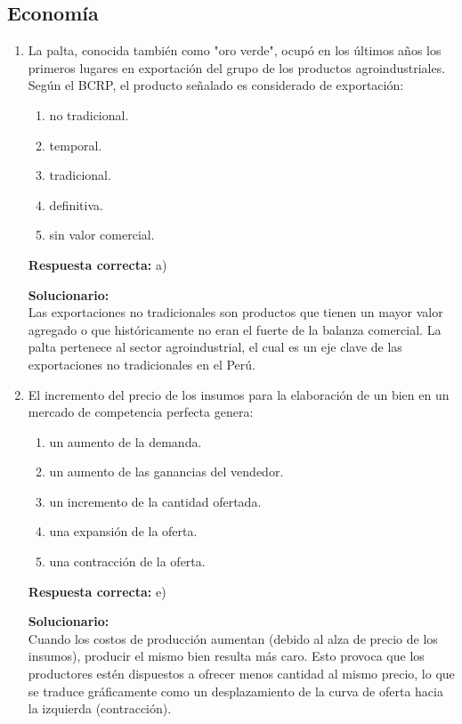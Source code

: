 \subsection*{Economía}

\begin{enumerate}
	
	\item La palta, conocida también como "oro verde", ocupó en los últimos años los primeros lugares en exportación del grupo de los productos agroindustriales. Según el BCRP, el producto señalado es considerado de exportación:
	\begin{enumerate}[label=\alph*)]
		\item no tradicional.
		\item temporal.
		\item tradicional.
		\item definitiva.
		\item sin valor comercial.
	\end{enumerate}
	\textbf{Respuesta correcta:} a)
	
	\vspace{2mm}
	\textbf{Solucionario:}\\
	Las exportaciones no tradicionales son productos que tienen un mayor valor agregado o que históricamente no eran el fuerte de la balanza comercial. La palta pertenece al sector agroindustrial, el cual es un eje clave de las exportaciones no tradicionales en el Perú.
	
	\vspace{6mm}
	
	\item El incremento del precio de los insumos para la elaboración de un bien en un mercado de competencia perfecta genera:
	\begin{enumerate}[label=\alph*)]
		\item un aumento de la demanda.
		\item un aumento de las ganancias del vendedor.
		\item un incremento de la cantidad ofertada.
		\item una expansión de la oferta.
		\item una contracción de la oferta.
	\end{enumerate}
	\textbf{Respuesta correcta:} e)
	
	\vspace{2mm}
	\textbf{Solucionario:}\\
	Cuando los costos de producción aumentan (debido al alza de precio de los insumos), producir el mismo bien resulta más caro. Esto provoca que los productores estén dispuestos a ofrecer menos cantidad al mismo precio, lo que se traduce gráficamente como un desplazamiento de la curva de oferta hacia la izquierda (contracción).
	
	\vspace{6mm}
	
\end{enumerate}


